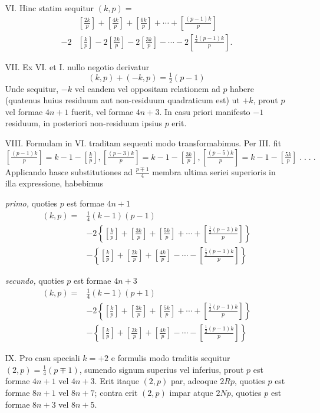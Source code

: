 \documentclass[14pt]{memoir}
\begin{document}
\begin{enumerate}
\item[VI.] Hinc statim sequitur \((k, p)=\)
\begin{align*}& \left[ \tfrac{2k}{p} \right] + \left[ \tfrac{4k}{p} \right] + \left[ \tfrac{6k}{p} \right] + \cdots + \left[ \tfrac{(p-1)k}{p} \right] \\
- 2& \left[ \tfrac{k}{p} \right] - 2 \left[ \tfrac{2k}{p} \right] -2  \left[ \tfrac{3k}{p} \right]-  \cdots -  2 \left[ \tfrac{\frac{1}{2} (p-1)k}{p} \right] .\end{align*}
\item[VII.] Ex VI. et I. nullo negotio derivatur 
\[ (k,p) + (-k,p) = \tfrac{1}{2} (p-1) \]
Unde sequitur,  \(-k\) vel eandem vel oppositam relationem ad \(p\) habere (quatenus huius residuum aut non-residuum quadraticum est) ut \(+k\), prout \(p\) vel formae \(4n+1\) fuerit, vel formae \(4n+3\). In casu priori manifesto \(-1\) residuum, in posteriori non-residuum ipsius \(p\) erit. 
\item[VIII.] Formulam in VI. traditam sequenti modo transformabimus. Per III. fit
\[ \left[ \tfrac{(p-1)k}{p}\right] = k-1-\left[\tfrac{k}{p}\right] , \left[ \tfrac{(p-3)k}{p}\right] = k-1-\left[\tfrac{3k}{p}\right] , \left[ \tfrac{(p-5)k}{p}\right] = k-1-\left[\tfrac{5k}{p}\right] \;.\;.\;.\;.\; \]
Applicando hasce substitutiones ad \(\tfrac{p\mp1}{4}\) membra ultima seriei superioris in illa expressione, habebimus 

\quad \textit{primo,} quoties \(p\) est formae \(4n+1\) 
 \begin{align*} (k,p) =& \tfrac{1}{4}(k-1)(p-1) \\
&-2\left\{ \left[ \tfrac{k}{p} \right] + \left[ \tfrac{3k}{p} \right] + \left[ \tfrac{5k}{p} \right] + \cdots + \left[ \tfrac{\frac{1}{2}(p-3)k}{p} \right]    \right\} \\
&- \left\{ \left[ \tfrac{k}{p} \right] + \left[ \tfrac{2k}{p} \right] + \left[ \tfrac{4k}{p} \right] - \cdots - \left[ \tfrac{\frac{1}{2}(p-1)k}{p} \right] \right\} \end{align*}

\quad \textit{secundo,} quoties \(p\) est formae \(4n+3\)
 \begin{align*} (k,p) =& \tfrac{1}{4}(k-1)(p+1) \\
&-2\left\{ \left[ \tfrac{k}{p} \right] + \left[ \tfrac{3k}{p} \right] + \left[ \tfrac{5k}{p} \right] + \cdots + \left[ \tfrac{\frac{1}{2}(p-1)k}{p} \right]    \right\} \\
&- \left\{ \left[ \tfrac{k}{p} \right] + \left[ \tfrac{2k}{p} \right] + \left[ \tfrac{4k}{p} \right] - \cdots - \left[ \tfrac{\frac{1}{2}(p-1)k}{p} \right] \right\} \end{align*}
\item[IX.] Pro casu speciali \(k=+2\) e formulis modo traditis sequitur \((2, p) = \tfrac{1}{4}(p\mp1)\), sumendo signum superius vel inferius, prout \(p\) est formae \(4n+1\) vel \(4n + 3\). Erit itaque \((2, p)\) par, adeoque \(2 R p\), quoties \(p\) est formae \(8n+1\) vel \(8n +7\); contra erit \((2, p)\) impar atque \(2Np\), quoties \(p\) est 
formae \(8n+3\) vel \(8n+5\). 
\end{enumerate}%
\end{document}
